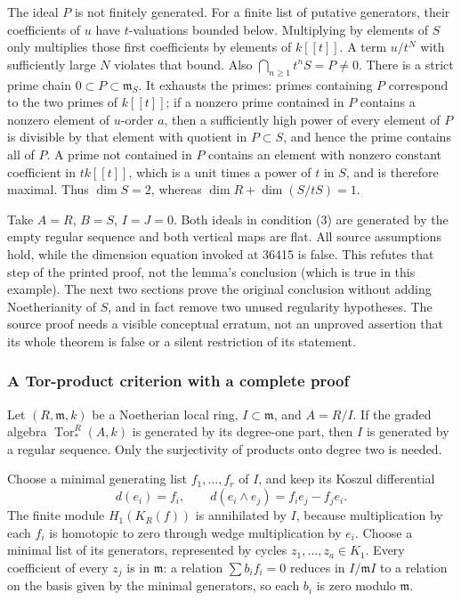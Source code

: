 The ideal \(P\) is not finitely generated. For a finite list of putative generators, their coefficients of \(u\) have \(t\)-valuations bounded below. Multiplying by elements of \(S\) only multiplies those first coefficients by elements of \(k[[t]]\). A term \(u/t^N\) with sufficiently large \(N\) violates that bound. Also \(\bigcap_{n\geq1}t^nS=P\ne0\). There is a strict prime chain \(0\subset P\subset\mathfrak m_S\). It exhausts the primes: primes containing \(P\) correspond to the two primes of \(k[[t]]\); if a nonzero prime contained in \(P\) contains a nonzero element of \(u\)-order \(a\), then a sufficiently high power of every element of \(P\) is divisible by that element with quotient in \(P\subset S\), and hence the prime contains all of \(P\). A prime not contained in \(P\) contains an element with nonzero constant coefficient in \(tk[[t]]\), which is a unit times a power of \(t\) in \(S\), and is therefore maximal. Thus \(\dim S=2\), whereas \(\dim R+\dim(S/tS)=1\).

Take \(A=R\), \(B=S\), \(I=J=0\). Both ideals in condition (3) are generated by the empty regular sequence and both vertical maps are flat. All source assumptions hold, while the dimension equation invoked at 36415 is false. This refutes that step of the printed proof, not the lemma's conclusion (which is true in this example). The next two sections prove the original conclusion without adding Noetherianity of \(S\), and in fact remove two unused regularity hypotheses. The source proof needs a visible conceptual erratum, not an unproved assertion that its whole theorem is false or a silent restriction of its statement.

\subsubsection{A Tor-product criterion with a complete proof}\label{algebra-proof-045-a-tor-product-criterion-with-a-complete-proof}

Let \((R,\mathfrak m,k)\) be a Noetherian local ring, \(I\subset\mathfrak m\), and \(A=R/I\). If the graded algebra \(\operatorname{Tor}^R_*(A,k)\) is generated by its degree-one part, then \(I\) is generated by a regular sequence. Only the surjectivity of products onto degree two is needed.

Choose a minimal generating list \(f_1,\ldots,f_r\) of \(I\), and keep its Koszul differential \[
d(e_i)=f_i,\qquad d(e_i\wedge e_j)=f_i e_j-f_j e_i.
\] The finite module \(H_1(K_R(f))\) is annihilated by \(I\), because multiplication by each \(f_i\) is homotopic to zero through wedge multiplication by \(e_i\). Choose a minimal list of its generators, represented by cycles \(z_1,\ldots,z_a\in K_1\). Every coefficient of every \(z_j\) is in \(\mathfrak m\): a relation \(\sum b_i f_i=0\) reduces in \(I/\mathfrak mI\) to a relation on the basis given by the minimal generators, so each \(b_i\) is zero modulo \(\mathfrak m\).

